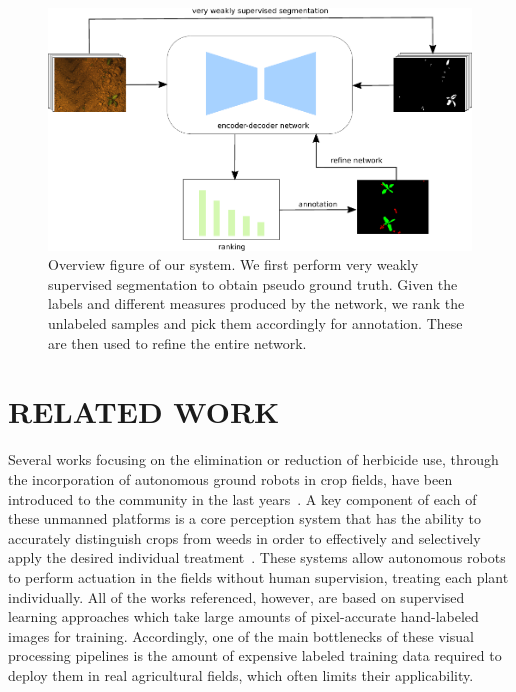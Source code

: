 \documentclass[letterpaper, 10 pt, conference]{ieeeconf}  %
\begin{document}
    \begin{figure}
    \vspace{1em}
    \centering
    \includegraphics[scale=0.9]{pics/output_system_overview.pdf}
   		\caption{Overview figure of our system. We first perform very weakly supervised segmentation to obtain pseudo ground truth. Given the labels and different measures produced by the network, we rank the unlabeled samples and pick them accordingly for annotation. These are then used to refine the entire network.}
		\label{fig:overview}    		
   \end{figure}
   

\section{RELATED WORK}
\label{sec:related}



Several works focusing on the elimination or reduction of herbicide use,
through the incorporation of autonomous ground robots in crop fields, have
been introduced to the community in the last years~\cite{ducket2018arxiv, liebisch2016wslw, mccool2018ral}.
A key component of each of these unmanned platforms is a core perception system that
has the ability to accurately distinguish crops from weeds in order to effectively
and selectively apply the desired individual treatment~\cite{ lottes2018iros, mccool2017ral,milioto2017uavg,milioto2018real, sa2018rs}.
These systems allow autonomous robots to perform actuation in the fields without human supervision, treating each plant individually.
All of the works referenced, however, are based on supervised learning approaches which take large amounts of pixel-accurate hand-labeled images for training. 
Accordingly, one of the main bottlenecks of these visual processing pipelines is the amount of expensive labeled training data required to deploy them in real agricultural fields, which often limits their applicability.
\end{document}
